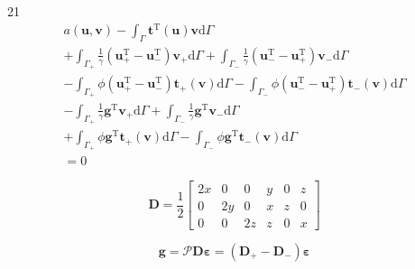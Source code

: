 \documentclass[a4paper,12pt]{article}
\begin{document}
21
\begin{equation}
\begin{split}
a(\mathbf{u},\mathbf{v})
-
\int_\Gamma
\mathbf{t}^\textrm{T}(\mathbf{u})\mathbf{v}
\textrm{d}\Gamma
\\+
\int_{\Gamma_+}
\frac{1}{\gamma}
(\mathbf{u}_+^\textrm{T} - \mathbf{u}_-^\textrm{T})
\mathbf{v}_+
\textrm{d}\Gamma
+
\int_{\Gamma_-}
\frac{1}{\gamma}
(\mathbf{u}_-^\textrm{T} - \mathbf{u}_+^\textrm{T})
\mathbf{v}_-
\textrm{d}\Gamma
\\-
\int_{\Gamma_+}
\phi
(\mathbf{u}_+^\textrm{T} - \mathbf{u}_-^\textrm{T})
\mathbf{t}_+(\mathbf{v})
\textrm{d}\Gamma
-
\int_{\Gamma_-}
\phi
(\mathbf{u}_-^\textrm{T} - \mathbf{u}_+^\textrm{T})
\mathbf{t}_-(\mathbf{v})
\textrm{d}\Gamma
\\-
\int_{\Gamma_+}
\frac{1}{\gamma}
\mathbf{g}^\textrm{T}
\mathbf{v}_+
\textrm{d}\Gamma
+
\int_{\Gamma_-}
\frac{1}{\gamma}
\mathbf{g}^\textrm{T}
\mathbf{v}_-
\textrm{d}\Gamma
\\+
\int_{\Gamma_+}
\phi\mathbf{g}^\textrm{T}
\mathbf{t}_+(\mathbf{v})
\textrm{d}\Gamma
-
\int_{\Gamma_-}
\phi\mathbf{g}^\textrm{T}
\mathbf{t}_-(\mathbf{v})
\textrm{d}\Gamma
\\=
0
\end{split}
\end{equation}

\begin{equation}
\mathbf{D}
=
\frac{1}{2}
\left[
\begin{array}{cccccc}
2x & 0 & 0 & y & 0 & z \\
0 & 2y & 0 & x & z & 0 \\
0 & 0 & 2z & z & 0 & x
\end{array}
\right]
\end{equation}

\begin{equation}
\mathbf{g}
=
\mathcal{P}\mathbf{D}{\boldsymbol\varepsilon}
=
(\mathbf{D}_{+}-\mathbf{D}_{-}){\boldsymbol\varepsilon}
\end{equation}
\end{document}
